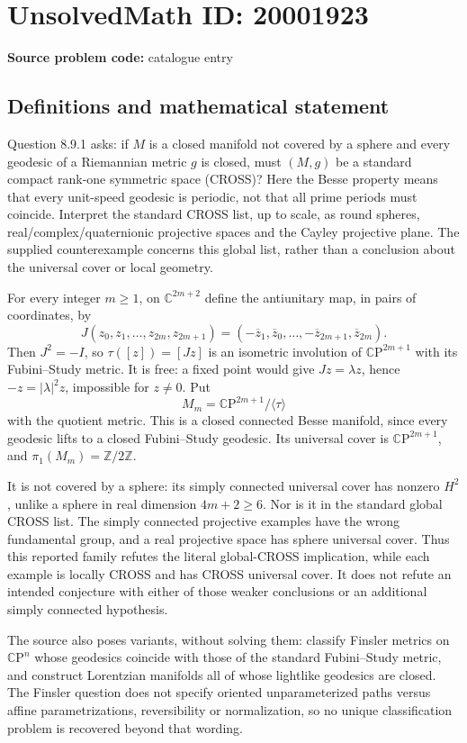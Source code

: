 \documentclass[11pt]{article}
\newcommand{\Z}{\mathbb{Z}}
\newcommand{\C}{\mathbb{C}}
\begin{document}
\section*{UnsolvedMath ID: 20001923}
\textbf{Source problem code:} catalogue entry
\subsection{Definitions and mathematical statement}
Question 8.9.1 asks: if \(M\) is a closed manifold not covered by a sphere and every geodesic of a Riemannian metric \(g\) is closed, must \((M,g)\) be a standard compact rank-one symmetric space (CROSS)? Here the Besse property means that every unit-speed geodesic is periodic, not that all prime periods must coincide. Interpret the standard CROSS list, up to scale, as round spheres, real/complex/quaternionic projective spaces and the Cayley projective plane. The supplied counterexample concerns this global list, rather than a conclusion about the universal cover or local geometry.

For every integer \(m\geq1\), on \(\C^{2m+2}\) define the antiunitary map, in pairs of coordinates, by
\[
 J(z_0,z_1,\ldots,z_{2m},z_{2m+1})
 =(-\overline z_1,\overline z_0,\ldots,
   -\overline z_{2m+1},\overline z_{2m}).
\]
Then \(J^2=-I\), so \(\tau([z])=[Jz]\) is an isometric involution of \(\C\mathrm P^{2m+1}\) with its Fubini--Study metric. It is free: a fixed point would give \(Jz=\lambda z\), hence \(-z=|\lambda|^2z\), impossible for \(z\ne0\). Put
\[
 M_m=\C\mathrm P^{2m+1}/\langle\tau\rangle
\]
with the quotient metric. This is a closed connected Besse manifold, since every geodesic lifts to a closed Fubini--Study geodesic. Its universal cover is \(\C\mathrm P^{2m+1}\), and \(\pi_1(M_m)=\Z/2\Z\).

It is not covered by a sphere: its simply connected universal cover has nonzero \(H^2\), unlike a sphere in real dimension \(4m+2\geq6\). Nor is it in the standard global CROSS list. The simply connected projective examples have the wrong fundamental group, and a real projective space has sphere universal cover. Thus this reported family refutes the literal global-CROSS implication, while each example is locally CROSS and has CROSS universal cover. It does not refute an intended conjecture with either of those weaker conclusions or an additional simply connected hypothesis.

The source also poses variants, without solving them: classify Finsler metrics on \(\C\mathrm P^n\) whose geodesics coincide with those of the standard Fubini--Study metric, and construct Lorentzian manifolds all of whose lightlike geodesics are closed. The Finsler question does not specify oriented unparameterized paths versus affine parametrizations, reversibility or normalization, so no unique classification problem is recovered beyond that wording.
\end{document}
